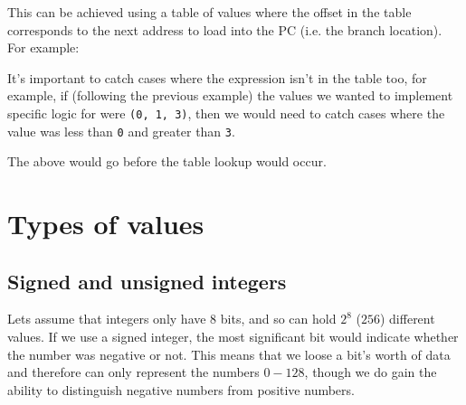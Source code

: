 This can be achieved using a table of values where the offset in the table
corresponds to the next address to load into the PC (i.e. the branch location).
For example:



It's important to catch cases where the expression isn't in the table too, for
example, if (following the previous example) the values we wanted to implement
specific logic for were {\tt (0, 1, 3)}, then we would need to catch cases where
the value was less than {\tt 0} and greater than {\tt 3}.


The above would go before the table lookup would occur.

\section{Types of values}

\subsection{Signed and unsigned integers}

Lets assume that integers only have 8 bits, and so can hold $2^8$ ($256$)
different values. If we use a signed integer, the most significant bit would
indicate whether the number was negative or not. This means that we loose a
bit's worth of data and therefore can only represent the numbers $0-128$, though
we do gain the ability to distinguish negative numbers from positive numbers.

